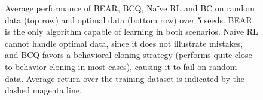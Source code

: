 \begin{figure}
\begin{subfigure}[t]{0.23\textwidth}
    \end{subfigure}
    \caption{\label{fig:optimal_random} \footnotesize Average performance of BEAR, BCQ, Na\"ive RL and BC on random data (top row) and optimal data (bottom row) over 5 seeds. BEAR is the only algorithm capable of learning in both scenarios. Na\"{i}ve RL cannot handle optimal data, since it does not illustrate mistakes, and BCQ favors a behavioral cloning strategy (performs quite close to behavior cloning in most cases), causing it to fail on random data. Average return over the training dataset is indicated by the dashed magenta line.}
\end{figure}


